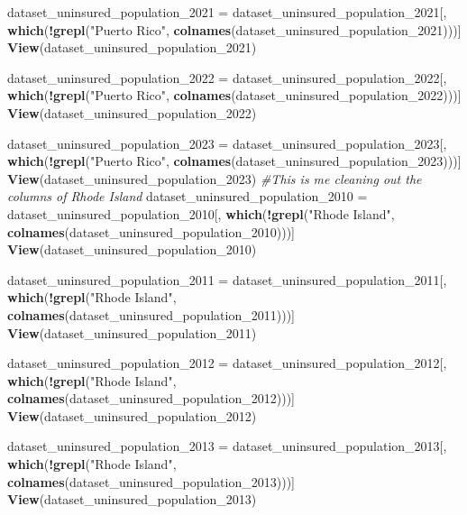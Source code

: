 \documentclass[
]{article}
\newenvironment{Shaded}{\begin{snugshade}}{\end{snugshade}}
\newcommand{\CommentTok}[1]{\textcolor[rgb]{0.56,0.35,0.01}{\textit{#1}}}
\newcommand{\FunctionTok}[1]{\textcolor[rgb]{0.13,0.29,0.53}{\textbf{#1}}}
\newcommand{\NormalTok}[1]{#1}
\newcommand{\OtherTok}[1]{\textcolor[rgb]{0.56,0.35,0.01}{#1}}
\newcommand{\SpecialCharTok}[1]{\textcolor[rgb]{0.81,0.36,0.00}{\textbf{#1}}}
\newcommand{\StringTok}[1]{\textcolor[rgb]{0.31,0.60,0.02}{#1}}
\begin{document}
\begin{Shaded}
\begin{Highlighting}[]
\NormalTok{dataset\_uninsured\_population\_2021 }\OtherTok{=}\NormalTok{ dataset\_uninsured\_population\_2021[, }\FunctionTok{which}\NormalTok{(}\SpecialCharTok{!}\FunctionTok{grepl}\NormalTok{(}\StringTok{"Puerto Rico"}\NormalTok{, }\FunctionTok{colnames}\NormalTok{(dataset\_uninsured\_population\_2021)))]}
\FunctionTok{View}\NormalTok{(dataset\_uninsured\_population\_2021)}

\NormalTok{dataset\_uninsured\_population\_2022 }\OtherTok{=}\NormalTok{ dataset\_uninsured\_population\_2022[, }\FunctionTok{which}\NormalTok{(}\SpecialCharTok{!}\FunctionTok{grepl}\NormalTok{(}\StringTok{"Puerto Rico"}\NormalTok{, }\FunctionTok{colnames}\NormalTok{(dataset\_uninsured\_population\_2022)))]}
\FunctionTok{View}\NormalTok{(dataset\_uninsured\_population\_2022)}

\NormalTok{dataset\_uninsured\_population\_2023 }\OtherTok{=}\NormalTok{ dataset\_uninsured\_population\_2023[, }\FunctionTok{which}\NormalTok{(}\SpecialCharTok{!}\FunctionTok{grepl}\NormalTok{(}\StringTok{"Puerto Rico"}\NormalTok{, }\FunctionTok{colnames}\NormalTok{(dataset\_uninsured\_population\_2023)))]}
\FunctionTok{View}\NormalTok{(dataset\_uninsured\_population\_2023)}
\CommentTok{\#This is me cleaning out the columns of Rhode Island}
\NormalTok{dataset\_uninsured\_population\_2010 }\OtherTok{=}\NormalTok{ dataset\_uninsured\_population\_2010[, }\FunctionTok{which}\NormalTok{(}\SpecialCharTok{!}\FunctionTok{grepl}\NormalTok{(}\StringTok{"Rhode Island"}\NormalTok{, }\FunctionTok{colnames}\NormalTok{(dataset\_uninsured\_population\_2010)))]}
\FunctionTok{View}\NormalTok{(dataset\_uninsured\_population\_2010)}

\NormalTok{dataset\_uninsured\_population\_2011 }\OtherTok{=}\NormalTok{ dataset\_uninsured\_population\_2011[, }\FunctionTok{which}\NormalTok{(}\SpecialCharTok{!}\FunctionTok{grepl}\NormalTok{(}\StringTok{"Rhode Island"}\NormalTok{, }\FunctionTok{colnames}\NormalTok{(dataset\_uninsured\_population\_2011)))]}
\FunctionTok{View}\NormalTok{(dataset\_uninsured\_population\_2011)}

\NormalTok{dataset\_uninsured\_population\_2012 }\OtherTok{=}\NormalTok{ dataset\_uninsured\_population\_2012[, }\FunctionTok{which}\NormalTok{(}\SpecialCharTok{!}\FunctionTok{grepl}\NormalTok{(}\StringTok{"Rhode Island"}\NormalTok{, }\FunctionTok{colnames}\NormalTok{(dataset\_uninsured\_population\_2012)))]}
\FunctionTok{View}\NormalTok{(dataset\_uninsured\_population\_2012)}

\NormalTok{dataset\_uninsured\_population\_2013 }\OtherTok{=}\NormalTok{ dataset\_uninsured\_population\_2013[, }\FunctionTok{which}\NormalTok{(}\SpecialCharTok{!}\FunctionTok{grepl}\NormalTok{(}\StringTok{"Rhode Island"}\NormalTok{, }\FunctionTok{colnames}\NormalTok{(dataset\_uninsured\_population\_2013)))]}
\FunctionTok{View}\NormalTok{(dataset\_uninsured\_population\_2013)}


\end{Highlighting}
\end{Shaded}
\end{document}
